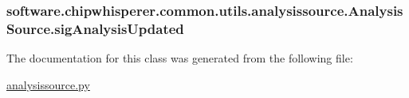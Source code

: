 \subsubsection[{sig\+Analysis\+Updated}]{\setlength{\rightskip}{0pt plus 5cm}software.\+chipwhisperer.\+common.\+utils.\+analysissource.\+Analysis\+Source.\+sig\+Analysis\+Updated}\label{classsoftware_1_1chipwhisperer_1_1common_1_1utils_1_1analysissource_1_1AnalysisSource_a829759e9661bf65cb8b21458f2dfb1e3}


The documentation for this class was generated from the following file\+:\begin{DoxyCompactItemize}
\item 
\hyperlink{analysissource_8py}{analysissource.\+py}\end{DoxyCompactItemize}
